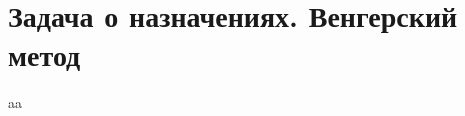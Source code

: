 \documentclass[discrete.tex]{subfiles}
\begin{document}
\section{Задача о назначениях. Венгерский метод}

aa
\end{document}
